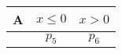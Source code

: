 \documentclass{standalone}
\begin{document}
 \begin{NiceTabular}{l|cc}
\toprule
\textsf{A} & $x\leq 0$ & $x>0$\\
\midrule
 & $p_5$ & $p_6$\\
\bottomrule
\end{NiceTabular}
\end{document}
